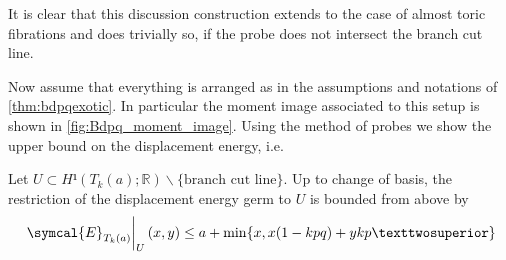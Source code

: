\documentclass[12pt,a4paper,draft]{scrartcl}
\begin{document}
It is clear that this discussion construction extends to the case of almost toric fibrations and does trivially so, if the probe does not intersect the branch cut line.

Now assume that everything is arranged as in the assumptions and notations of \cref{thm:bdpqexotic}.
In particular the moment image associated to this setup is shown in \cref{fig:Bdpq_moment_image}.
Using the method of probes we show the upper bound on the displacement energy, i.e.


\begin{lemma}
    \label{thm:upper_bound}
  Let $U ⊂ H¹(T_k(a);ℝ) ∖ \{\text{branch cut line}\}$.
  Up to change of basis, the restriction of the displacement energy germ to $U$ is bounded from above by
  \[ \eval{\symcal{E}_{T_k(a)}}_U (x,y) \leq a+\min\{x,x(1-kpq)+ykp²\} \]
\end{lemma}
\end{document}

